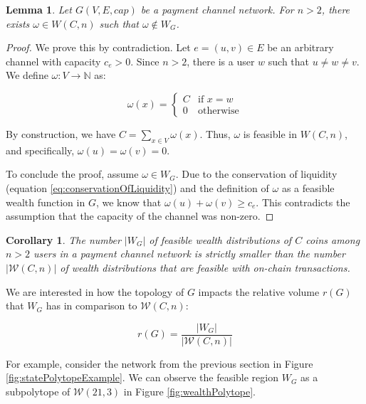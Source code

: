 \documentclass[10pt,twocolumn]{article}
\newtheorem{corollary}{Corollary}[theorem]
\newtheorem{lemma}[theorem]{Lemma}
\begin{document}
\begin{lemma}
\label{lem:subset}
Let \( G(V,E,cap) \) be a payment channel network. For \( n > 2 \), there exists \( \omega \in W(C,n) \) such that \( \omega \notin W_G \).
\end{lemma}

\begin{proof}
We prove this by contradiction. Let \( e = (u,v) \in E \) be an arbitrary channel with capacity \( c_e > 0 \). Since \( n > 2 \), there is a user \( w \) such that \( u \neq w \neq v \). We define \( \omega: V \longrightarrow \mathbb{N} \) as:

\begin{equation}
\omega(x) = \begin{cases}
C & \text{if } x = w \\
0 & \text{otherwise}
\end{cases}
\end{equation}

By construction, we have \( C = \sum_{x \in V} \omega(x) \). Thus, \( \omega \) is feasible in \( W(C,n) \), and specifically, \( \omega(u) = \omega(v) = 0 \).

To conclude the proof, assume \( \omega \in W_G \). Due to the conservation of liquidity (equation \ref{eq:conservationOfLiquidity}) and the definition of \( \omega \) as a feasible wealth function in \( G \), we know that \( \omega(u) + \omega(v) \geq c_e \). This contradicts the assumption that the capacity of the channel was non-zero.
\end{proof}

\begin{corollary}
The number \( |W_G| \) of feasible wealth distributions of \( C \) coins among \( n > 2 \) users in a payment channel network is strictly smaller than the number \( |\mathcal{W}(C,n)| \) of wealth distributions that are feasible with on-chain transactions.
\end{corollary}

We are interested in how the topology of \( G \) impacts the relative volume \( r(G) \) that \( W_G \) has in comparison to \( \mathcal{W}(C,n) \):

\begin{equation}
r(G) = \frac{|W_G|}{|\mathcal{W}(C,n)|}
\label{eq:relVolume}
\end{equation}

For example, consider the network from the previous section in Figure \ref{fig:statePolytopeExample}. We can observe the feasible region \( W_G \) as a subpolytope of \( \mathcal{W}(21,3) \) in Figure \ref{fig:wealthPolytope}.
\end{document}
